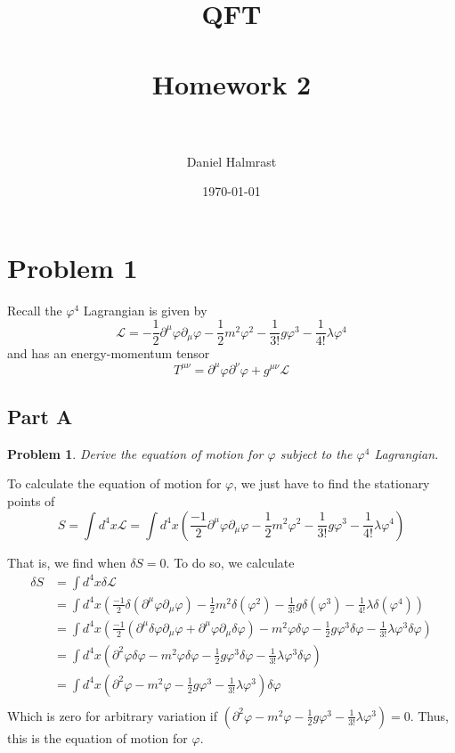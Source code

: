 \documentclass[fontsize=11pt]{scrartcl} %
\title{	
\normalfont \normalsize 
\textsc{QFT} \\ [25pt] %
\horrule{0.5pt} \\[0.4cm] %
\huge Homework 2 \\ %
\horrule{2pt} \\[0.5cm] %
}
\author{Daniel Halmrast} %
\date{\normalsize\today} %
\numberwithin{equation}{section} %
\numberwithin{figure}{section} %
\numberwithin{table}{section} %
\newtheorem*{problem}{Problem}
\begin{document}
\maketitle %

\section*{Problem 1}
Recall the $\varphi^4$ Lagrangian is given by
\[
    \mathscr{L} = -\frac{1}{2}\partial^{\mu}\varphi\partial_{\mu}\varphi -
    \frac{1}{2}m^2\varphi^2 - \frac{1}{3!}g\varphi^3 -
    \frac{1}{4!}\lambda\varphi^4
\]
and has an energy-momentum tensor
\[
    T^{\mu\nu} = \partial^{\mu}\varphi\partial^{\nu}\varphi +
    g^{\mu\nu}\mathscr{L}
\]
\subsection*{Part A}
\begin{problem}
    Derive the equation of motion for $\varphi$ subject to the $\varphi^4$
    Lagrangian.
\end{problem}

To calculate the equation of motion for $\varphi$, we just have to find the
stationary points of
\[
    S = \int d^4x\mathscr{L} = \int d^4x
    \left(\frac{-1}{2}\partial^{\mu}\varphi\partial_{\mu}\varphi -
    \frac{1}{2}m^2\varphi^2 - \frac{1}{3!}g\varphi^3 -
\frac{1}{4!}\lambda\varphi^4\right)
\]

That is, we find when $\delta S=0$. To do so, we calculate
\[
    \begin{aligned}
        \delta S &= \int d^4x \delta \mathscr{L}\\
        &=\int d^4x 
        \left(  
            \frac{-1}{2}\delta(\partial^{\mu}\varphi\partial_{\mu}\varphi) -
            \frac{1}{2}m^2\delta(\varphi^2) - \frac{1}{3!}g\delta(\varphi^3) -
            \frac{1}{4!}\lambda\delta(\varphi^4)
        \right)\\
        &=\int d^4x 
        \left(  
            \frac{-1}{2}(\partial^{\mu}\delta\varphi\partial_{\mu}\varphi +
            \partial^{\mu}\varphi\partial_{\mu}\delta\varphi) -
            m^2\varphi\delta\varphi - \frac{1}{2}g\varphi^3\delta\varphi -
            \frac{1}{3!}\lambda\varphi^3\delta\varphi
        \right)\\
        &=\int d^4x 
        \left(  
            \partial^2\varphi\delta\varphi -
            m^2\varphi\delta\varphi - \frac{1}{2}g\varphi^3\delta\varphi -
            \frac{1}{3!}\lambda\varphi^3\delta\varphi
        \right)\\
        &=\int d^4x 
        \left(  
            \partial^2\varphi -
            m^2\varphi - \frac{1}{2}g\varphi^3 -
            \frac{1}{3!}\lambda\varphi^3
        \right)\delta\varphi\\
    \end{aligned}
\]
Which is zero for arbitrary variation if $
\left(  \partial^2\varphi - m^2\varphi - \frac{1}{2}g\varphi^3 - 
\frac{1}{3!}\lambda\varphi^3 \right)=0$. Thus, this is the equation of motion
for $\varphi$.
\end{document}
